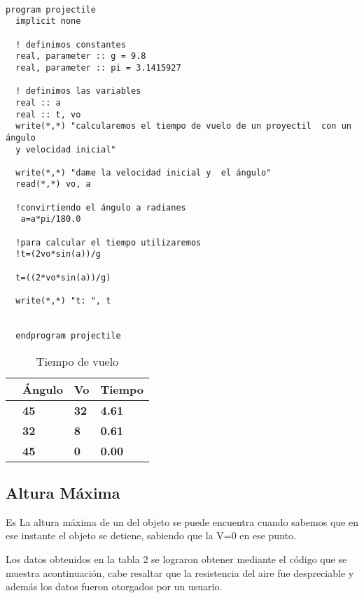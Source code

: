 \documentclass{article}
\begin{document}
\begin{verbatim}




program projectile
  implicit none

  ! definimos constantes
  real, parameter :: g = 9.8
  real, parameter :: pi = 3.1415927

  ! definimos las variables
  real :: a
  real :: t, vo
  write(*,*) "calcularemos el tiempo de vuelo de un proyectil  con un ángulo
  y velocidad inicial"

  write(*,*) "dame la velocidad inicial y  el ángulo"
  read(*,*) vo, a

  !convirtiendo el ángulo a radianes
   a=a*pi/180.0

  !para calcular el tiempo utilizaremos
  !t=(2vo*sin(a))/g

  t=((2*vo*sin(a))/g)

  write(*,*) "t: ", t


  endprogram projectile
  \end{verbatim}


\begin{table}[]
\centering
\caption{ Tiempo de vuelo}
\label{my-label}
\begin{tabular}{|l|l|l|l|}
\hline
\textbf{} & \textbf{Ángulo} & \textbf{Vo} & \textbf{Tiempo} \\ \hline
\textbf{} & \textbf{45}     & \textbf{32} & \textbf{4.61}   \\ \hline
\textbf{} & \textbf{32}     & \textbf{8}  & \textbf{0.61}   \\ \hline
\textbf{} & \textbf{45}     & \textbf{0}  & \textbf{0.00}   \\ \hline
\end{tabular}
\end{table}



\subsection{Altura Máxima}

Es La altura máxima de un del objeto se puede encuentra cuando sabemos que en ese instante el objeto se detiene, sabiendo que la V=0 en ese punto.

Los datos obtenidos en la tabla 2 se lograron obtener mediante el código que se muestra acontinuación, cabe resaltar que la resistencia del aire fue despreciable y además los datos fueron otorgados por un usuario.
\end{document}
